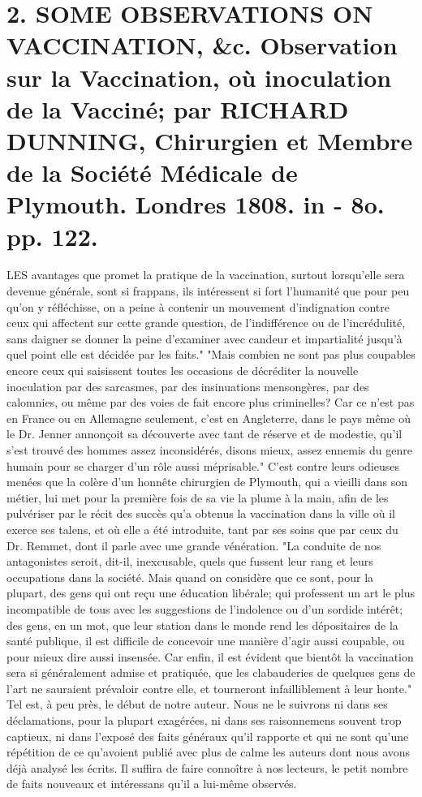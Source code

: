 \section{2. SOME OBSERVATIONS ON VACCINATION, &c. Observation sur la Vaccination, où inoculation de la Vacciné; par RICHARD DUNNING, Chirurgien et Membre de la Société Médicale de Plymouth. Londres 1808. in - 8o. pp. 122.}
LES avantages que promet la pratique de la vaccination, surtout lorsqu'elle sera devenue générale, sont si frappans, ils intéressent si fort l'humanité que pour peu qu'on y réfléchisse, on a peine à contenir un mouvement d'indignation contre ceux qui affectent sur cette grande question, de l'indifférence ou de l'incrédulité, sans daigner se donner la peine d'examiner avec candeur et impartialité jusqu'à quel point elle est décidée par les faits."
"Mais combien ne sont pas plus coupables encore ceux qui saisissent toutes les occasions de décréditer la nouvelle inoculation\setcounter{page}{374} par des sarcasmes, par des insinuations mensongères, par des calomnies, ou même par des voies de fait encore plus criminelles? Car ce n'est pas en France ou en Allemagne seulement, c'est en Angleterre, dans le pays même où le Dr. Jenner annonçoit sa découverte avec tant de réserve et de modestie, qu'il s'est trouvé des hommes assez inconsidérés, disons mieux, assez ennemis du genre humain pour se charger d'un rôle aussi méprisable."
C'est contre leurs odieuses menées que la colère d'un honnête chirurgien de Plymouth, qui a vieilli dans son métier, lui met pour la première fois de sa vie la plume à la main, afin de les pulvériser par le récit des succès qu'a obtenus la vaccination dans la ville où il exerce ses talens, et où elle a été introduite, tant par ses soins que par ceux du Dr. Remmet, dont il parle avec une grande vénération.
"La conduite de nos antagonistes seroit, dit-il, inexcusable, quels que fussent leur rang et leurs occupations dans la société. Mais quand on considère que ce sont, pour la plupart, des gens qui ont reçu une éducation libérale; qui professent un art le plus incompatible de tous avec les suggestions de l'indolence ou d'un sordide intérêt; des gens, en un mot, que\setcounter{page}{375} leur station dans le monde rend les dépositaires de la santé publique, il est difficile de concevoir une manière d'agir aussi coupable, ou pour mieux dire aussi insensée. Car enfin, il est évident que bientôt la vaccination sera si généralement admise et pratiquée, que les clabauderies de quelques gens de l'art ne sauraient prévaloir contre elle, et tourneront infailliblement à leur honte."
Tel est, à peu près, le début de notre auteur. Nous ne le suivrons ni dans ses déclamations, pour la plupart exagérées, ni dans ses raisonnemens souvent trop captieux, ni dans l'exposé des faits généraux qu'il rapporte et qui ne sont qu'une répétition de ce qu'avoient publié avec plus de calme les auteurs dont nous avons déjà analysé les écrits. Il suffira de faire connoître à nos lecteurs, le petit nombre de faits nouveaux et intéressans qu'il a lui-même observés.

